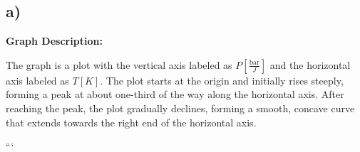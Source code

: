 

\subsection*{a)}
\textbf{Graph Description:} 

The graph is a plot with the vertical axis labeled as \( P \left[ \frac{\text{bar}}{J} \right] \) and the horizontal axis labeled as \( T \left[ K \right] \). The plot starts at the origin and initially rises steeply, forming a peak at about one-third of the way along the horizontal axis. After reaching the peak, the plot gradually declines, forming a smooth, concave curve that extends towards the right end of the horizontal axis.

```